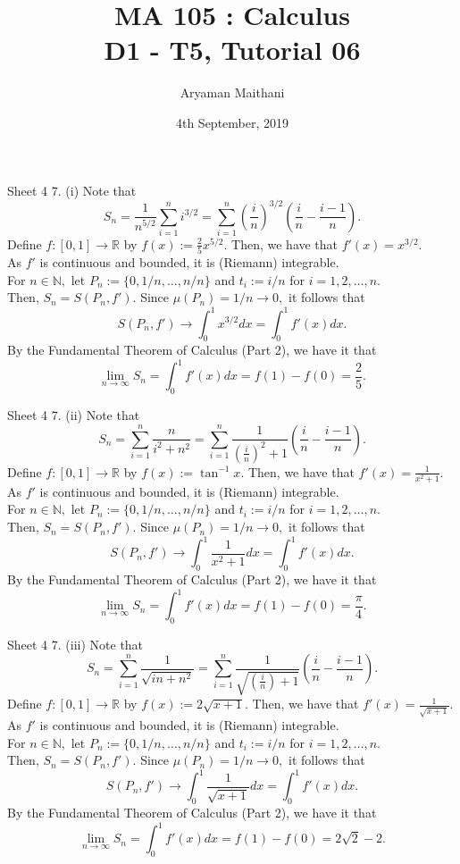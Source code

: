 \documentclass[handout, aspectratio=169]{beamer}
\title{MA 105 : Calculus\\ D1 - T5, Tutorial 06}  %
\author{Aryaman Maithani}
\date[4-09-2019]{4th September, 2019}               %
\institute[IITB]{IIT Bombay}
\begin{document}
\begin{frame}
	\titlepage
\end{frame}
\begin{frame}{Sheet 4}                            %
	7. (i) Note that \\
	\[S_n = \dfrac{1}{n^{5/2}}\displaystyle\sum_{i=1}^{n}i^{3/2} = \sum_{i=1}^{n}\left(\dfrac{i}{n}\right)^{3/2}\left(\dfrac{i}{n} - \dfrac{i-1}{n}\right).\]
	Define $f:[0, 1] \to \mathbb{R}$ by $f(x) := \frac{2}{5}x^{5/2}.$ Then, we have that $f'(x) = x^{3/2}.$\\
	As $f'$ is continuous and bounded, it is (Riemann) integrable. \\
	For $n \in \mathbb{N},$ let $P_n := \{0, 1/n, \ldots, n/n\}$ and $t_i := i/n$ for $i = 1, 2, \ldots, n.$\\
	Then, $S_n = S(P_n, f').$ Since $\mu(P_n) = 1/n \to 0,$ it follows that
	\[S(P_n, f') \to \int_{0}^{1} x^{3/2} dx = \int_{0}^{1} f'(x) dx. \]
	By the Fundamental Theorem of Calculus (Part 2), we have it that
	\[\lim_{n\to \infty}S_n = \int_{0}^{1} f'(x) dx = f(1) - f(0) = \dfrac{2}{5}.\]
\end{frame}
\begin{frame}{Sheet 4}
	7. (ii) Note that \\
	\[S_n = \sum_{i=1}^{n}\dfrac{n}{i^2 + n^2} = \sum_{i=1}^{n}\dfrac{1}{\left(\frac{i}{n}\right)^2 + 1}\left(\frac{i}{n} - \frac{i-1}{n}\right) .\]
	Define $f:[0, 1] \to \mathbb{R}$ by $f(x) := \tan^{-1}x.$ Then, we have that $f'(x) = \frac{1}{x^2 + 1}.$\\
	As $f'$ is continuous and bounded, it is (Riemann) integrable. \\
	For $n \in \mathbb{N},$ let $P_n := \{0, 1/n, \ldots, n/n\}$ and $t_i := i/n$ for $i = 1, 2, \ldots, n.$\\
	Then, $S_n = S(P_n, f').$ Since $\mu(P_n) = 1/n \to 0,$ it follows that
	\[S(P_n, f') \to \int_{0}^{1} \dfrac{1}{x^2 + 1} dx = \int_{0}^{1} f'(x) dx. \]
	By the Fundamental Theorem of Calculus (Part 2), we have it that
	\[\lim_{n\to \infty}S_n = \int_{0}^{1} f'(x) dx = f(1) - f(0) = \dfrac{\pi}{4}.\]
\end{frame}
\begin{frame}{Sheet 4}
	7. (iii) Note that \\
	\[S_n = \sum_{i=1}^{n}\dfrac{1}{\sqrt{in + n^2}} = \sum_{i=1}^{n}\dfrac{1}{\sqrt{\left(\frac{i}{n}\right) + 1}}\left(\frac{i}{n} - \frac{i-1}{n}\right) .\]
	Define $f:[0, 1] \to \mathbb{R}$ by $f(x) := 2\sqrt{x + 1}.$ Then, we have that $f'(x) = \frac{1}{\sqrt{x+ 1}}.$\\
	As $f'$ is continuous and bounded, it is (Riemann) integrable. \\
	For $n \in \mathbb{N},$ let $P_n := \{0, 1/n, \ldots, n/n\}$ and $t_i := i/n$ for $i = 1, 2, \ldots, n.$\\
	Then, $S_n = S(P_n, f').$ Since $\mu(P_n) = 1/n \to 0,$ it follows that
	\[S(P_n, f') \to \int_{0}^{1} \frac{1}{\sqrt{x+ 1}} dx = \int_{0}^{1} f'(x) dx. \]
	By the Fundamental Theorem of Calculus (Part 2), we have it that
	\[\lim_{n\to \infty}S_n = \int_{0}^{1} f'(x) dx = f(1) - f(0) = 2\sqrt{2} - 2.\]
\end{frame}
\end{document}
